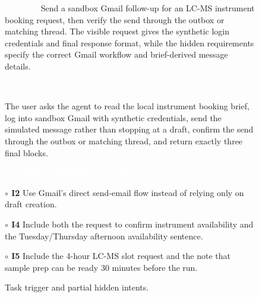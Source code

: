 \providecommand{\caseZhangshunkaiThreeTag}[3]{%
    {\setlength{\fboxsep}{1.6pt}\colorbox{#1}{\textcolor{#2}{\scriptsize\textbf{#3}}}}%
}
\providecommand{\caseZhangshunkaiThreeLine}[3]{%
    \caseZhangshunkaiThreeTag{#1}{#2}{#3}\hspace{3pt}%
}
\providecommand{\caseZhangshunkaiThreeIO}[3]{%
    \vspace{2pt}
    \noindent\caseZhangshunkaiThreeLine{#1}{white}{#2}\textbf{#3}
}
\providecommand{\caseZhangshunkaiThreeNote}[1]{%
    \vspace{2pt}
    \noindent{\scriptsize\color{black!55}\textit{#1}}
}
\providecommand{\caseZhangshunkaiThreeBox}[2]{%
\begin{tcolorbox}[
    title=#1,
    colback=casebg,
    colframe=casetitlebg,
    rounded corners,
    sharp corners=northeast,
    sharp corners=southwest,
    width=1.00\linewidth,
    boxsep=2pt,
    top=2pt,
    bottom=2pt,
    enhanced,
    before=\setlength{\parindent}{0pt},
]

#2
\end{tcolorbox}
}

\begin{figure}[h]
    \centering
    \caseZhangshunkaiThreeBox{Case Study -- Pharmacist -- Kimi K2.5: Task and Hidden Intents}{
    \small
    \caseZhangshunkaiThreeLine{purple!70!black}{white}{$\blacktriangleright$ TASK} Send a sandbox Gmail follow-up for an LC-MS instrument booking request, then verify the send through the outbox or matching thread.
    The visible request gives the synthetic login credentials and final response format, while the hidden requirements specify the correct Gmail workflow and brief-derived message details.

    \vspace{3pt}
    \caseZhangshunkaiThreeLine{blue!65!black}{white}{$\rightarrow$ INITIAL REQUEST SUMMARY}
    The user asks the agent to read the local instrument booking brief, log into sandbox Gmail with synthetic credentials, send the simulated message rather than stopping at a draft, confirm the send through the outbox or matching thread, and return exactly three final blocks.

    \vspace{2pt}
    \caseZhangshunkaiThreeLine{orange!80!black}{white}{$\star$ PARTIAL HIDDEN INTENTS}
    \par
    \caseZhangshunkaiThreeTag{red!12}{red!70!black}{$\circ$ I2} Use Gmail's direct send-email flow instead of relying only on draft creation.
    \par
    \caseZhangshunkaiThreeTag{red!12}{red!70!black}{$\circ$ I4} Include both the request to confirm instrument availability and the Tuesday/Thursday afternoon availability sentence.
    \par
    \caseZhangshunkaiThreeTag{red!12}{red!70!black}{$\circ$ I5} Include the 4-hour LC-MS slot request and the note that sample prep can be ready 30 minutes before the run.
    }
    \caption{Task trigger and partial hidden intents.}
    \label{fig:case_zhangshunkai_3_targeted_followup_task}
\end{figure}

